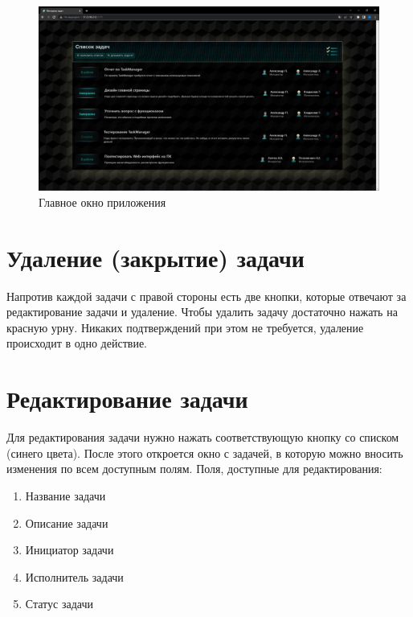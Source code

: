 \documentclass{altsu-report}
\begin{document}
\begin{figure}[!ht]
    \centering
    \includegraphics[scale=0.3]{main_screen.png}
    \caption{Главное окно приложения}
    \label{fig:mainscreen}
\end{figure}

\section*{Удаление (закрытие) задачи}

Напротив каждой задачи с правой стороны есть две кнопки, которые отвечают за редактирование задачи и удаление. Чтобы удалить задачу достаточно нажать на красную урну. Никаких подтверждений при этом не требуется, удаление происходит в одно действие.

\section*{Редактирование задачи}

Для редактирования задачи нужно нажать соответствующую кнопку со списком (синего цвета). После этого откроется окно с задачей, в которую можно вносить изменения по всем доступным полям. Поля, доступные для редактирования:

\begin{enumerate}
    \item Название задачи

    \item Описание задачи

    \item Инициатор задачи

    \item Исполнитель задачи

    \item Статус задачи
\end{enumerate}
\end{document}
